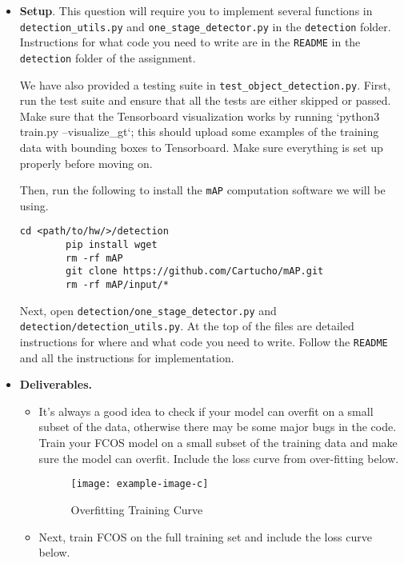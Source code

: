 \documentclass[11pt,addpoints,answers]{exam}
\numberwithin{equation}{section} %
\numberwithin{figure}{section} %
\numberwithin{table}{section} %
\begin{document}
\begin{itemize}
    \item \textbf{Setup}. This question will require you to implement several functions in \texttt{detection\_utils.py} and \texttt{one\_stage\_detector.py} in the \texttt{detection} folder. Instructions for what code you need to write are in the \texttt{README} in the \texttt{detection} folder of the assignment.
    
    We have also provided a testing suite in \texttt{test\_object\_detection.py}. First, run the test suite
    and ensure that all the tests are either skipped or passed. Make sure that the Tensorboard visualization works by running `python3 train.py --visualize\_gt`; this should upload some examples of the training data with bounding boxes to Tensorboard. Make sure everything is set up properly before moving on.

    Then, run the following to install the \texttt{mAP} computation software we will be using.
    \begin{lstlisting}[language=Shell]
        cd <path/to/hw/>/detection
        pip install wget  
        rm -rf mAP
        git clone https://github.com/Cartucho/mAP.git
        rm -rf mAP/input/*
    \end{lstlisting}

    Next, open \texttt{detection/one\_stage\_detector.py} and \texttt{detection/detection\_utils.py}. At the top of the files are detailed
    instructions for where and what code you need to write. Follow the \texttt{README} and all the instructions for implementation. 

    \item \textbf{Deliverables.}
    \begin{itemize}
        \item It's always a good idea to check if your model can overfit on a small subset of the data, otherwise there may be some major bugs in the code. Train your FCOS model on a small subset of the training data and make sure the model can overfit. Include the loss curve from over-fitting below.

        \begin{figure}[H]
            \centering
            \texttt{[image: example-image-c]}
            \caption{Overfitting Training Curve}
            \label{fig:overfit_plot}
        \end{figure}
        
        \item Next, train FCOS on the full training set and include the loss curve below.


\end{itemize}
\end{itemize}
\end{document}
